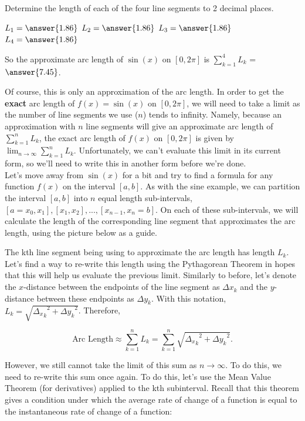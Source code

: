 \documentclass[handout,nooutcomes]{ximera}
\begin{document}

\begin{problem}
Determine the length of each of the four line segments to 2 decimal places.

$L_1 = \answer{1.86}$
$L_2 = \answer{1.86}$
$L_3 = \answer{1.86}$
$L_4 = \answer{1.86}$

So the approximate arc length of $\sin(x)$ on $[0, 2\pi]$ is $\displaystyle\sum_{k=1}^4 L_k$ = $\answer{7.45}$.
\end{problem}

Of course, this is only an approximation of the arc length.  In order to get the \textbf{exact} arc length of $f(x) = \sin(x)$ on $[0, 2\pi]$, we will need to take a limit as the number of line segments we use ($n$) tends to infinity.  Namely, because an approximation with $n$ line segments will give an approximate arc length of $\displaystyle\sum_{k=1}^n L_k$, the exact arc length of $f(x)$ on $[0, 2\pi]$ is given by $\displaystyle\lim_{n \to \infty} \displaystyle\sum_{k=1}^n L_k$.  Unfortunately, we can't evaluate this limit in its current form, so we'll need to write this in another form before we're done.  \\

Let's move away from $\sin(x)$ for a bit and try to find a formula for any function $f(x)$ on the interval $[a,b]$.  As with the sine example, we can partition the interval $[a,b]$ into $n$ equal length sub-intervals, $[a=x_0, x_1], [x_1, x_2], ..., [x_{n-1}, x_n = b]$.  On each of these sub-intervals, we will calculate the length of the corresponding line segment that approximates the arc length, using the picture below as a guide. 


The kth line segment being using to approximate the arc length has length $L_k$.  Let's find a way to re-write this length using the Pythagorean Theorem in hopes that this will help us evaluate the previous limit.  Similarly to before, let's denote the $x$-distance between the endpoints of the line segment as ${\Delta x}_k$ and the $y$-distance between these endpoints as ${\Delta y}_k$.  With this notation, $L_k = \sqrt{{{\Delta_x}_k}^2+{{\Delta y}_k}^2}$.  Therefore, 

$$\text{Arc Length} \approx \displaystyle\sum_{k=1}^n L_k = \displaystyle\sum_{k=1}^n \sqrt{{{\Delta_x}_k}^2+{{\Delta y}_k}^2}.$$

However, we still cannot take the limit of this sum as $n \to \infty$.  To do this, we need to re-write this sum once again.  To do this, let's use the Mean Value Theorem (for derivatives) applied to the kth subinterval.  Recall that this theorem gives a condition under which the average rate of change of a function is equal to the instantaneous rate of change of a function: 
\end{document}
